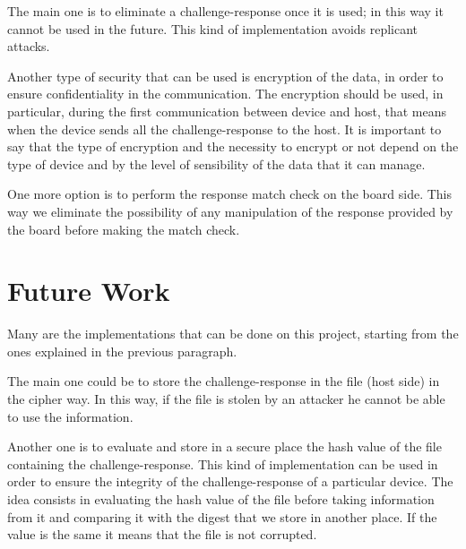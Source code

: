 The main one is to eliminate a challenge-response once it is used; in this way it cannot be used in the future. This kind of implementation avoids replicant attacks.

Another type of security that can be used is encryption of the data, in order to ensure confidentiality in the communication. The encryption should be used, in particular, during the first communication between device and host, that means when the device sends all the challenge-response to the host.
It is important to say that the type of encryption and the necessity to encrypt or not depend on the type of device and by the level of sensibility of the data that it can manage.

One more option is to perform the response match check on the board side. This way we eliminate the possibility of any manipulation of the response provided by the board before making the match check.


\section{Future Work}
Many are the implementations that can be done on this project, starting from the ones explained in the previous paragraph.


The main one could be to store the challenge-response in the file (host side) in the cipher way. In this way, if the file is stolen by an attacker he cannot be able to use the information.

Another one is to evaluate and store in a secure place the hash value of the file containing the challenge-response.
This kind of implementation can be used in order to ensure the integrity of the challenge-response of a particular device.
The idea consists in evaluating the hash value of the file before taking information from it and comparing it with the digest that we store in another place.
If the value is the same it means that the file is not corrupted.



